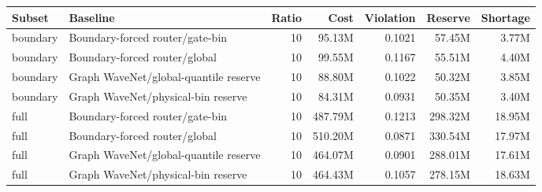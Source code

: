 \begin{tabular}{llrrrrr}
\toprule
Subset & Baseline & Ratio & Cost & Violation & Reserve & Shortage \\
\midrule
boundary & Boundary-forced router/gate-bin & 10 & 95.13M & 0.1021 & 57.45M & 3.77M \\
boundary & Boundary-forced router/global & 10 & 99.55M & 0.1167 & 55.51M & 4.40M \\
boundary & Graph WaveNet/global-quantile reserve & 10 & 88.80M & 0.1022 & 50.32M & 3.85M \\
boundary & Graph WaveNet/physical-bin reserve & 10 & 84.31M & 0.0931 & 50.35M & 3.40M \\
full & Boundary-forced router/gate-bin & 10 & 487.79M & 0.1213 & 298.32M & 18.95M \\
full & Boundary-forced router/global & 10 & 510.20M & 0.0871 & 330.54M & 17.97M \\
full & Graph WaveNet/global-quantile reserve & 10 & 464.07M & 0.0901 & 288.01M & 17.61M \\
full & Graph WaveNet/physical-bin reserve & 10 & 464.43M & 0.1057 & 278.15M & 18.63M \\
\bottomrule
\end{tabular}
